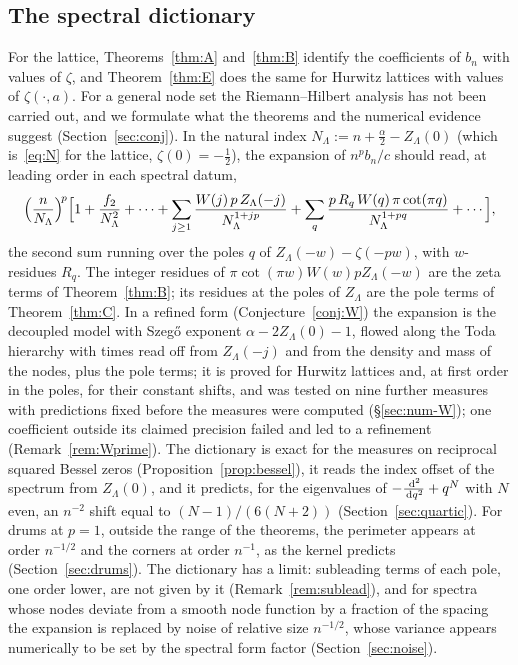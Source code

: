 \subsection{The spectral dictionary}\label{sec:dictionary}
For the lattice, Theorems~\ref{thm:A} and~\ref{thm:B} identify the coefficients of $b_n$ with values of $\zeta$, and
Theorem~\ref{thm:E} does the same for Hurwitz lattices with values of $\zeta(\cdot,a)$. For a general node set the
Riemann--Hilbert analysis has not been carried out, and we formulate what the theorems and the numerical evidence suggest
(Section~\ref{sec:conj}). In the natural index $N_\Lambda:=n+\frac\alpha2-Z_\Lambda(0)$
(which is~\eqref{eq:N} for the lattice, $\zeta(0)=-\frac12$), the expansion of $n^pb_n/c$ should read, at leading
order in each spectral datum,
\[
  \Bigl(\frac n{N_\Lambda}\Bigr)^{\!p}\Bigl[1+\frac{f_2}{N_\Lambda^2}+\dotsb
  +\sum_{j\ge1}\frac{W(j)\,p\,Z_\Lambda(-j)}{N_\Lambda^{1+jp}}
  +\sum_q\frac{p\,R_q\,W(q)\,\pi\cot(\pi q)}{N_\Lambda^{1+pq}}+\dotsb\Bigr],
\]
the second sum running over the poles $q$ of $Z_\Lambda(-w)-\zeta(-pw)$, with $w$-residues $R_q$. The integer residues
of $\pi\cot(\pi w)W(w)pZ_\Lambda(-w)$ are the zeta terms of Theorem~\ref{thm:B}; its residues at the poles of $Z_\Lambda$
are the pole terms of Theorem~\ref{thm:C}. In a refined form (Conjecture~\ref{conj:W}) the expansion is the decoupled model with Szeg\H{o} exponent $\alpha-2Z_\Lambda(0)-1$,
flowed along the Toda hierarchy with times read off from $Z_\Lambda(-j)$ and from the density and mass of the nodes, plus the pole
terms; it is proved for Hurwitz lattices and, at first order in the poles, for their constant shifts, and was tested on nine further
measures with predictions fixed before the measures were computed (\S\ref{sec:num-W}); one coefficient outside its claimed
precision failed and led to a refinement (Remark~\ref{rem:Wprime}). The dictionary is exact for the measures on reciprocal squared
Bessel zeros (Proposition~\ref{prop:bessel}), it reads the index offset of the spectrum from $Z_\Lambda(0)$, and it
predicts, for the eigenvalues of $-\frac{\,\mathrm{d}^2}{\,\mathrm{d} q^2}+q^N$ with $N$ even, an $n^{-2}$ shift equal to
$(N-1)/(6(N+2))$ (Section~\ref{sec:quartic}). For drums at $p=1$, outside the range of the theorems, the perimeter
appears at order $n^{-1/2}$ and the corners at order $n^{-1}$, as the kernel predicts (Section~\ref{sec:drums}). The
dictionary has a limit: subleading terms of each pole, one order lower, are not given by it
(Remark~\ref{rem:sublead}), and for spectra whose nodes deviate from a smooth node function by a fraction of the
spacing the expansion is replaced by noise of relative size $n^{-1/2}$, whose variance appears numerically to be set by the
spectral form factor (Section~\ref{sec:noise}).

